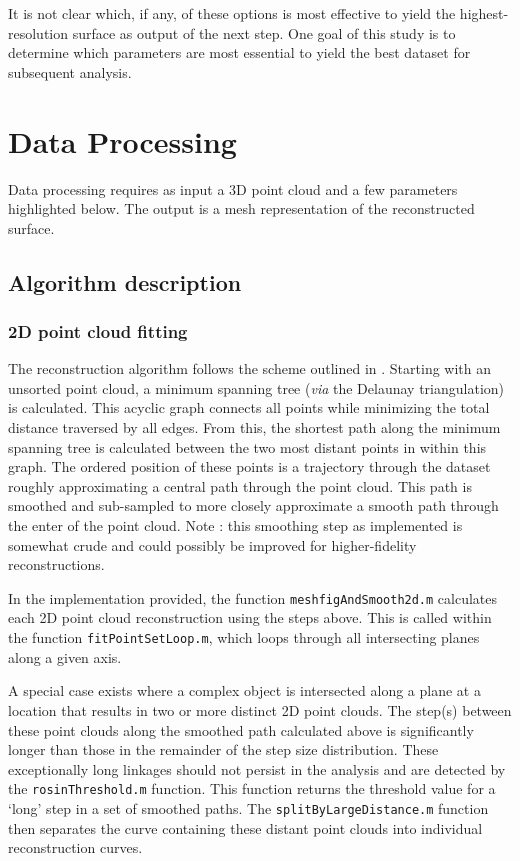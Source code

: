 \documentclass[10pt,a4paper]{article}
\begin{document}
It is not clear which, if any, of these options is most effective to yield the highest-resolution surface as output of the next step.  One goal of this study is to determine which parameters are most essential to yield the best dataset for subsequent analysis.  

\section{Data Processing}

Data processing requires as input a 3D point cloud and a few parameters highlighted below.  The output is a mesh representation of the reconstructed surface. 

\subsection{Algorithm description}

\subsubsection{2D point cloud fitting}

The reconstruction algorithm follows the scheme outlined in \cite{lee2000curve}. Starting with an unsorted point cloud, a minimum spanning tree (\textit{via} the Delaunay triangulation) is calculated.  This acyclic graph connects all points while minimizing the total distance traversed by all edges.  From this, the shortest path along the minimum spanning tree is calculated between the two most distant points in within this graph. The ordered position of these points is a trajectory through the dataset roughly approximating a central path through the point cloud.  This path is smoothed and sub-sampled to more closely approximate a smooth path through the enter of the point cloud.  Note : this smoothing step as implemented is somewhat crude and could possibly be improved for higher-fidelity reconstructions. 

In the implementation provided, the function \texttt{meshfigAndSmooth2d.m} calculates each 2D point cloud reconstruction using the steps above. This is called within the function \texttt{fitPointSetLoop.m}, which loops through all intersecting planes along a given axis.  

A special case exists where a complex object is intersected along a plane at a location that results in two or more distinct 2D point clouds.  The step(s) between these point clouds along the smoothed path calculated above is significantly longer than those in the remainder of the step size distribution.  These exceptionally long linkages should not persist in the analysis and are detected by the \texttt{rosinThreshold.m} function.  This function returns the threshold value for a `long' step in a set of smoothed paths.  The \texttt{splitByLargeDistance.m} function then separates the curve containing these distant point clouds into individual reconstruction curves.  
\end{document}
